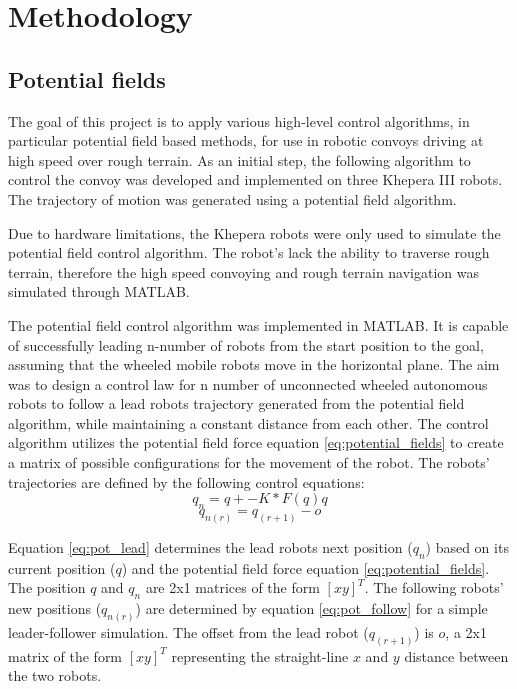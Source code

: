 \chapter{Methodology}
\section{Potential fields}
The goal of this project is to apply various high-level control algorithms, in particular potential field based methods, for use in robotic convoys driving at high speed over rough terrain. As an initial step, the following algorithm to control the convoy was developed and implemented on three Khepera III robots. The trajectory of motion was generated using a potential field algorithm.

Due to hardware limitations, the Khepera robots were only used to simulate the potential field control algorithm. The robot's lack the ability to traverse rough terrain, therefore the high speed convoying and rough terrain navigation was simulated through MATLAB.

The potential field control algorithm was implemented in MATLAB. It is capable of successfully leading n-number of robots from the start position to the goal, assuming that the wheeled mobile robots move in the horizontal plane. The aim was to design a control law for n number of unconnected wheeled autonomous robots to follow a lead robots trajectory generated from the potential field algorithm, while maintaining a constant distance from each other. The control algorithm utilizes the potential field force equation \eqref{eq:potential_fields} to create a matrix of possible configurations for the movement of the robot. The robots' trajectories are defined by the following control equations:
\begin{equation} \label{eq:pot_lead}
	q_n=q+-K*F(q)q
\end{equation}
\begin{equation} \label{eq:pot_follow}
	q_{n(r)}=q_{(r+1)}-o
\end{equation}

Equation \eqref{eq:pot_lead} determines the lead robots next position ($q_n$) based on its current position ($q$) and the potential field force equation \eqref{eq:potential_fields}. The position $q$ and $q_n$ are 2x1 matrices of the form $[x y]^T$. The following robots' new positions ($q_{n(r)}$) are determined by equation \eqref{eq:pot_follow} for a simple leader-follower simulation. The offset from the lead robot ($q_{(r+1)}$) is $o$, a 2x1 matrix of the form $[x y]^T$ representing the straight-line $x$ and $y$ distance between the two robots.

